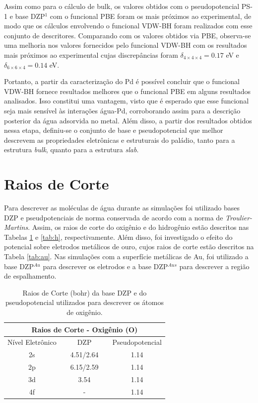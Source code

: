 Assim como para o cálculo de bulk, os valores obtidos com o pseudopotencial PS-1 e base DZP$ ^1 $ com o funcional PBE foram os mais próximos ao experimental, de modo que os cálculos envolvendo o funcional VDW-BH foram realizados com esse conjunto de descritores. Comparando com os valores obtidos via PBE, observa-se uma melhoria nos valores fornecidos pelo funcional VDW-BH com os resultados mais próximos ao experimental cujas discrepâncias foram $\delta_{4\times4\times4}=0.17$ eV e $\delta_{6\times6\times4}=0.14$ eV.



Portanto, a partir da caracterização do Pd é possível concluir que o funcional VDW-BH fornece resultados melhores que o funcional PBE em alguns resultados analisados. Isso constitui uma vantagem, visto que é esperado que esse funcional seja mais sensível às interações água-Pd, corroborando assim para a descrição posterior da água adsorvida no metal. Além disso, a partir dos resultados obtidos nessa etapa, definiu-se o conjunto de base e pseudopotencial que melhor descrevem as propriedades eletrônicas e estruturais do paládio, tanto para a estrutura \textit{bulk}, quanto para a estrutura \textit{slab}. 


\section{Raios de Corte}
Para descrever as moléculas de água durante as simulações foi utilizado bases DZP e pseudpotenciais de norma conservada de acordo com a norma de \textit{Troulier-Martins}. Assim, os raios de corte do oxigênio e do hidrogênio estão descritos nas Tabelas \ref{tab:o} e \ref{tab:h}, respectivamente. Além disso, foi investigado o efeito do potencial sobre eletrodos metálicos de ouro, cujos raios de corte estão descritos na Tabela \ref{tab:au}. Nas simulações com a superfície metálicas de Au, foi utilizado a base DZP$ ^{Au} $ para descrever os eletrodos e a base DZP$^{Aus}  $ para descrever a região de espalhamento.

\begin{table}[H]
	\centering
		\caption{Raios de Corte (bohr) da base DZP e do pseudopotencial utilizados para descrever os átomos de oxigênio.\label{tab:o}}
	\begin{tabular}{clccc} 
		\hline\hline
		\multicolumn{5}{c}{Raios de Corte - Oxigênio (O)}          \\ 
		\midrule
		Nível Eletrônico &  & DZP &  & Pseudopotencial  \\ 
		\midrule
		2s               &  & 4.51/2.64  &  & 1.14             \\
		2p               &  & 6.15/2.59  &  & 1.14             \\
		3d               &  & 3.54       &  & 1.14             \\
		4f               &  & -          &  & 1.14             \\
		\hline\hline
	\end{tabular}
\end{table}


